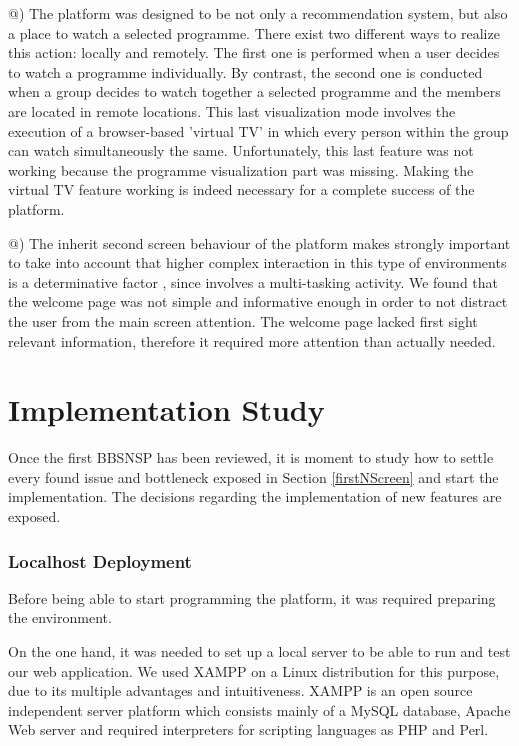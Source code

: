 \documentclass{acm_proc_article-sp}
\makeatletter
\newcommand*{\rom}[1]{\expandafter\@slowromancap\romannumeral #1@}
\makeatother
\begin{document}
\rom{4}) The platform was designed to be not only a recommendation system, but also a place to watch a selected programme. There exist two different ways to realize this action: locally and remotely. 
The first one is performed when a user decides to watch a programme individually. By contrast, the second one is conducted when a group decides to watch together a selected programme and the members are located in remote locations. This last visualization mode involves the execution of a browser-based 'virtual TV' in which every person within the group can watch simultaneously the same. Unfortunately,  this last feature was not working because the programme visualization part was missing. Making the virtual TV feature working is indeed necessary for a complete success of the platform. 

\rom{5}) The inherit second screen behaviour of the platform makes strongly important to take into account that higher complex interaction in this type of environments is a determinative factor \cite{cruickshank2007making}, since involves a multi-tasking activity. We found that the welcome page was not simple and informative enough in order to not distract the user from the main screen attention. The welcome page lacked first sight relevant information, therefore it required more attention than actually needed. 

\section{Implementation Study}
Once the first BBSNSP has been reviewed, it is moment to study how to settle every found issue and bottleneck exposed in Section \ref{firstNScreen} and start the implementation. The decisions regarding the implementation of new features are exposed. 

\subsubsection{Localhost Deployment}

Before being able to start programming the platform, it was required preparing the environment. 

On the one hand, it was needed to set up a local server to be able to run and test our web application. We used XAMPP on a Linux distribution for this purpose, due to its multiple advantages and intuitiveness. XAMPP is an open source independent server platform which consists mainly of a MySQL database, Apache Web server and required interpreters for scripting languages as PHP and Perl. 
\end{document}
